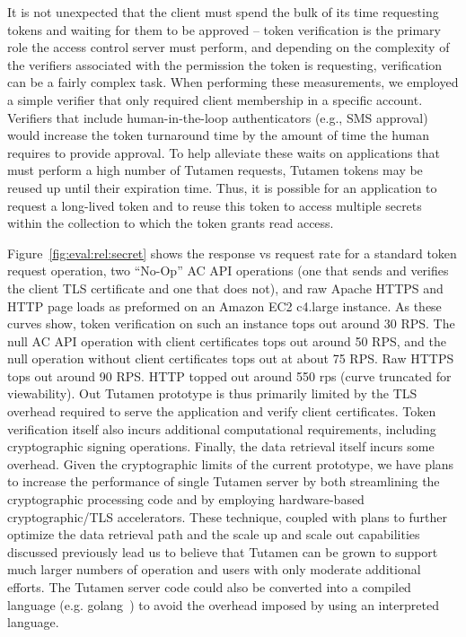 It is not unexpected that the client must spend the bulk of its time
requesting tokens and waiting for them to be approved -- token
verification is the primary role the access control server must
perform, and depending on the complexity of the verifiers associated
with the permission the token is requesting, verification can be a
fairly complex task. When performing these measurements, we employed a
simple verifier that only required client membership in a specific
account. Verifiers that include human-in-the-loop authenticators
(e.g., SMS approval) would increase the token turnaround time by the
amount of time the human requires to provide approval. To help
alleviate these waits on applications that must perform a high number
of Tutamen requests, Tutamen tokens may be reused up until their
expiration time. Thus, it is possible for an application to request a
long-lived token and to reuse this token to access multiple secrets
within the collection to which the token grants read access.
 
Figure~\ref{fig:eval:rel:secret} shows the response vs request rate
for a standard token request operation, two ``No-Op'' AC API
operations (one that sends and verifies the client TLS certificate and
one that does not), and raw Apache HTTPS and HTTP page loads as
preformed on an Amazon EC2 c4.large instance. As these curves show,
token verification on such an instance tops out around 30 RPS. The
null AC API operation with client certificates tops out around 50 RPS,
and the null operation without client certificates tops out at about
75 RPS. Raw HTTPS tops out around 90 RPS. HTTP topped out around 550
rps (curve truncated for viewability). Out Tutamen prototype is thus
primarily limited by the TLS overhead required to serve the
application and verify client certificates. Token verification itself
also incurs additional computational requirements, including
cryptographic signing operations. Finally, the data retrieval itself
incurs some overhead. Given the cryptographic limits of the current
prototype, we have plans to increase the performance of single Tutamen
server by both streamlining the cryptographic processing code and by
employing hardware-based cryptographic/TLS accelerators. These
technique, coupled with plans to further optimize the data retrieval
path and the scale up and scale out capabilities discussed previously
lead us to believe that Tutamen can be grown to support much larger
numbers of operation and users with only moderate additional
efforts. The Tutamen server code could also be converted into a
compiled language (e.g. golang~\cite{golang}) to avoid the overhead
imposed by using an interpreted language.

